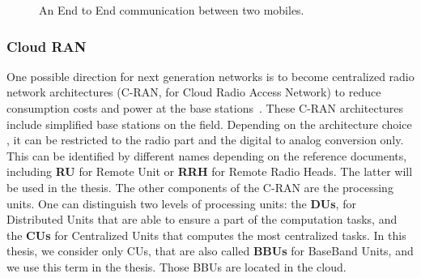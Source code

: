\begin{figure}
\begin{center}
{
}




 \caption{An End to End communication between two mobiles.}

\label{fig:RAN}
\end{center}
\end{figure}


\subsubsection{Cloud RAN}

One possible direction for next generation networks is to become centralized radio network architectures (C-RAN, for Cloud Radio Access Network) to reduce consumption costs and power at the base stations~\cite{mobile2011c}. These C-RAN architectures include simplified base stations on the field. Depending on the architecture choice  
, it can be restricted to the radio part and the digital to analog conversion only. This can be identified by different names depending on the reference documents, including \textbf{RU} for Remote Unit or \textbf{RRH} for Remote Radio Heads. The latter will be used in the thesis. The other components of the C-RAN  are the processing units. One can distinguish two levels of processing units: the \textbf{DUs}, for Distributed Units that are able to ensure a part of the computation tasks, and the \textbf{CUs} for Centralized Units that computes the most centralized tasks. In this thesis, we consider only CUs, that are also called \textbf{BBUs} for BaseBand Units, and we use this term in the thesis. Those BBUs are located in the cloud. 

